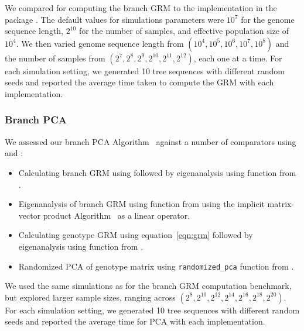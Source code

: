 We compared \tsGRM{} for computing the branch GRM to
the implementation in the \eGRM{} package \citep{fan2022genealogical}.
%
The default values for simulations parameters were $10^{7}$ for the genome sequence length,
$2^{10}$ for the number of samples, and effective population size of $10^4$.
%
We then varied
genome sequence length from $(10^{4}, 10^{5}, 10^{6}, 10^{7}, 10^{8})$ and
the number of samples from $(2^7, 2^8, 2^9, 2^{10}, 2^{11}, 2^{12})$,
each one at a time.
%
For each simulation setting, we generated 10 tree sequences with different random seeds and
reported the average time taken to compute the GRM with each implementation.

\subsubsection{Branch PCA}

We assessed our branch PCA Algorithm~ against a number of comparators
using \scipy{} \citep{Virtanen2020SciPy} and \scikitallel{} \citep{Miles2024scikit}:
%
\begin{itemize}
    \item Calculating branch GRM using \tsGRM{} followed by eigenanalysis using \eigh{} function from \scipy{}.
    \item Eigenanalysis of branch GRM using \eigsh{} function from \scipy{} using the implicit matrix-vector product Algorithm~ as a linear operator.
    \item Calculating genotype GRM using equation~\eqref{eqn:grm} followed by eigenanalysis using \eigh{} function from \scipy{}.
    \item Randomized PCA of genotype matrix using \texttt{randomized\_pca} function from \scikitallel{}.
\end{itemize}
%
We used the same simulations as for the branch GRM computation benchmark,
but explored larger sample sizes, ranging across $(2^8, 2^{10}, 2^{12}, 2^{14}, 2^{16}, 2^{18}, 2^{20})$.
%
For each simulation setting, we generated 10 tree sequences with different random seeds and
reported the average time for PCA with each implementation.

